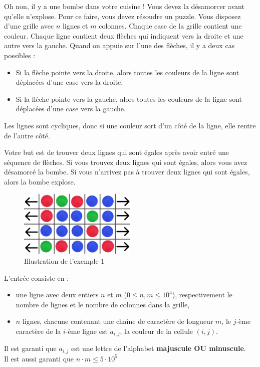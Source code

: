 \problemname{\problemyamlname}


Oh non, il y a une bombe dans votre cuisine ! Vous devez la désamorcer avant qu'elle n'explose. Pour ce faire, vous devez résoudre un puzzle.
Vous disposez d'une grille avec $n$ lignes et $m$ colonnes. Chaque case de la grille contient une couleur. Chaque ligne contient deux flèches qui indiquent vers la droite et une autre vers la gauche.
Quand on appuie sur l'une des flèches, il y a deux cas possibles :
\begin{itemize}
    \item Si la flèche pointe vers la droite, alors toutes les couleurs de la ligne sont déplacées d'une case vers la droite.
    \item Si la flèche pointe vers la gauche, alors toutes les couleurs de la ligne sont déplacées d'une case vers la gauche.
\end{itemize}
Les lignes sont cycliques, donc si une couleur sort d'un côté de la ligne, elle rentre de l'autre côté.

Votre but est de trouver deux lignes qui sont égales après avoir entré une séquence de flèches. Si vous trouvez deux lignes qui sont égales, alors vous avez désamorcé la bombe. Si vous n'arrivez pas à trouver deux lignes qui sont égales, alors la bombe explose.

\begin{figure}[H]
    \centering
    \includegraphics[width=0.5\textwidth]{illustration.png}
    \caption{Illustration de l'exemple 1}
\end{figure}

\begin{Input}
    L'entrée consiste en :
    \begin{itemize}
        \item une ligne avec deux entiers $n$ et $m$ ($0\leq n,m \leq 10^4$), respectivement le nombre de lignes et le nombre de colonnes dans la grille,
        \item $n$ lignes, chacune contenant une chaîne de caractère de longueur $m$, le $j$-ème caractère de la $i$-ème ligne est $a_{i,j}$, la couleur de la cellule $(i,j)$.
    \end{itemize}
    Il est garanti que $a_{i,j}$ est une lettre de l'alphabet \textbf{majuscule OU minuscule}.\\
    Il est aussi garanti que $n \cdot m \leq 5 \cdot 10^5$
\end{Input}

